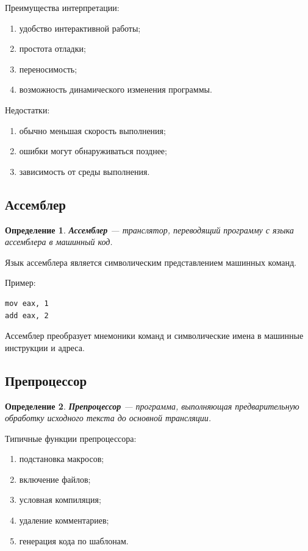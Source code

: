 \documentclass[12pt,a4paper]{article}
\newtheorem{definition}{Определение}
\begin{document}
Преимущества интерпретации:
\begin{enumerate}
  \item удобство интерактивной работы;
  \item простота отладки;
  \item переносимость;
  \item возможность динамического изменения программы.
\end{enumerate}

Недостатки:
\begin{enumerate}
  \item обычно меньшая скорость выполнения;
  \item ошибки могут обнаруживаться позднее;
  \item зависимость от среды выполнения.
\end{enumerate}

\subsection{Ассемблер}

\begin{definition}
\textbf{Ассемблер} --- транслятор, переводящий программу с языка ассемблера в машинный код.
\end{definition}

Язык ассемблера является символическим представлением машинных команд.

Пример:

\begin{lstlisting}
mov eax, 1
add eax, 2
\end{lstlisting}

Ассемблер преобразует мнемоники команд и символические имена в машинные инструкции и адреса.

\subsection{Препроцессор}

\begin{definition}
\textbf{Препроцессор} --- программа, выполняющая предварительную обработку исходного текста до основной трансляции.
\end{definition}

Типичные функции препроцессора:
\begin{enumerate}
  \item подстановка макросов;
  \item включение файлов;
  \item условная компиляция;
  \item удаление комментариев;
  \item генерация кода по шаблонам.
\end{enumerate}
\end{document}

